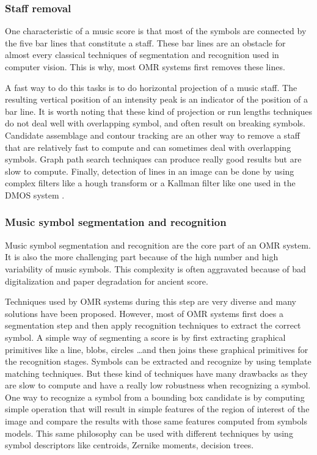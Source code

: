 \documentclass[11pt]{sdm}
\begin{document}
\subsubsection{Staff removal}

One characteristic of a music score is that most of the symbols are connected by the five bar lines that constitute a staff.
These bar lines are an obstacle for almost every classical techniques of segmentation and recognition used in computer vision.
This is why, most OMR systems first removes these lines.

A fast way to do this tasks is to do horizontal projection of a music staff.
The resulting vertical position of an intensity peak is an indicator of the position of a bar line.
It is worth noting that these kind of projection or run lengths techniques do not deal well with overlapping symbol, and often result on breaking symbols.
Candidate assemblage and contour tracking are an other way to remove a staff that are relatively fast to compute and can sometimes deal with overlapping symbols.
Graph path search techniques can produce really good results but are slow to compute.
Finally, detection of lines in an image can be done by using complex filters like a hough transform or a Kallman filter like one used in the DMOS system \cite{couasnon_dmos_2001}.



\subsubsection{Music symbol segmentation and recognition}


Music symbol segmentation and recognition are the core part of an OMR system.
It is also the more challenging part because of the high number and high variability of music symbols.
This complexity is often aggravated because of bad digitalization and paper degradation for ancient score.

Techniques used by OMR systems during this step are very diverse and many solutions have been proposed.
However, most of OMR systems first does a segmentation step and then apply recognition techniques to extract the correct symbol.
A simple way of segmenting a score is by first extracting graphical primitives like a line, blobs, circles \ldots and then joins these graphical primitives for the recognition stages.
Symbols can be extracted and recognize by using template matching techniques.
But these kind of techniques have many drawbacks as they are slow to compute and have a really low robustness when recognizing a symbol.
One way to recognize a symbol from a bounding box candidate is by computing simple operation that will result in simple features of the region of interest of the image and compare the results with those same features computed from symbols models.
This same philosophy can be used with different techniques by using symbol descriptors like centroids, Zernike moments, decision trees.
\end{document}
